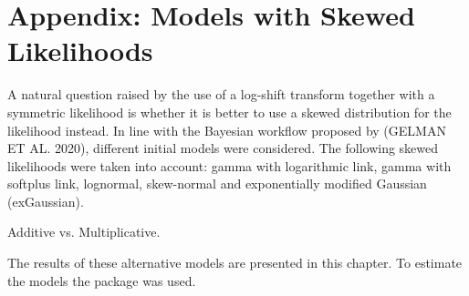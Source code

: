 \chapter{Appendix: Models with Skewed Likelihoods}

A natural question raised by the use of a log-shift transform together with a symmetric likelihood is whether it is better to use a skewed distribution for the likelihood instead.
In line with the Bayesian workflow proposed by (GELMAN ET AL. 2020), different initial models were considered.
The following skewed likelihoods were taken into account: gamma with logarithmic link, gamma with
softplus link, lognormal, skew-normal and exponentially modified Gaussian (exGaussian).

Additive vs. Multiplicative.

The results of these alternative models are presented in this chapter.
To estimate the models the package  was used.

